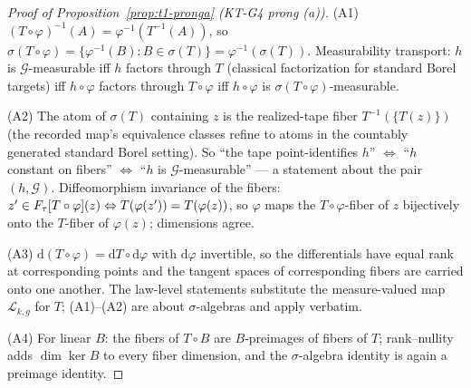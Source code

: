 \begin{proof}[Proof of Proposition~\ref{prop:t1-pronga} (KT-G4 prong (a))]
(A1) $(T \circ \varphi)^{-1}(A) = \varphi^{-1}(T^{-1}(A))$, so
$\sigma(T \circ \varphi) = \{\varphi^{-1}(B) : B \in \sigma(T)\} =
\varphi^{-1}(\sigma(T))$. Measurability transport: $h$ is
$\mathcal{G}$-measurable iff $h$ factors through $T$ (classical
factorization for standard Borel targets) iff $h \circ \varphi$ factors
through $T \circ \varphi$ iff $h \circ \varphi$ is
$\sigma(T \circ \varphi)$-measurable.

(A2) The atom of $\sigma(T)$ containing $z$ is the realized-tape fiber
$T^{-1}(\{T(z)\})$ (the recorded map's equivalence classes refine to atoms
in the countably generated standard Borel setting). So ``the tape
point-identifies $h$'' $\Leftrightarrow$ ``$h$ constant on fibers''
$\Leftrightarrow$ ``$h$ is $\mathcal{G}$-measurable'' --- a statement
about the pair $(h, \mathcal{G})$. Diffeomorphism invariance of the
fibers: $z' \in F_{\tau}[T \circ \varphi](z) \Leftrightarrow
T(\varphi(z')) = T(\varphi(z))$, so $\varphi$ maps the $T \circ
\varphi$-fiber of $z$ bijectively onto the $T$-fiber of $\varphi(z)$;
dimensions agree.

(A3) $\mathrm{d}(T \circ \varphi) = \mathrm{d}T \circ \mathrm{d}\varphi$
with $\mathrm{d}\varphi$ invertible, so the differentials have equal rank
at corresponding points and the tangent spaces of corresponding fibers are
carried onto one another. The law-level statements substitute the
measure-valued map $\mathcal{L}_{k,g}$ for $T$; (A1)--(A2) are about
$\sigma$-algebras and apply verbatim.

(A4) For linear $B$: the fibers of $T \circ B$ are $B$-preimages of
fibers of $T$; rank--nullity adds $\dim \ker B$ to every fiber dimension,
and the $\sigma$-algebra identity is again a preimage identity.
\end{proof}


